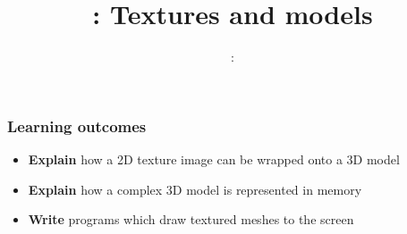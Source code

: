 \usepackage{../../beamerthemeFalmouthGamesAcademy}
\usepackage{multimedia}
\graphicspath{ {../../} }





\usepackage[normalem]{ulem}
\usepackage{wasysym}

\usepackage{pdfpages}

\usetikzlibrary{arrows,automata}




\title{\sessionnumber: Textures and models}
\subtitle{\modulecode: \moduletitle}

\frame{\titlepage} 

\begin{frame}
	\frametitle{Learning outcomes}
	\begin{itemize}
		\item \textbf{Explain} how a 2D texture image can be wrapped onto a 3D model
		\item \textbf{Explain} how a complex 3D model is represented in memory
		\item \textbf{Write} programs which draw textured meshes to the screen
	\end{itemize}
\end{frame}











